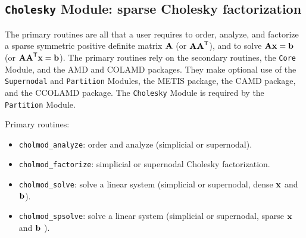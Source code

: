 \documentclass[11pt]{article}
\newcommand{\m}[1]{{\bf{#1}}}       %
\newcommand{\tr}{^{\sf T}}          %
\begin{document}
\newpage \subsection{{\tt Cholesky} Module: sparse Cholesky factorization}

The primary routines are all that a user requires to order, analyze, and
factorize a sparse symmetric positive definite matrix $\m{A}$ (or $\m{AA}\tr$), and
to solve $\m{Ax}=\m{b}$ (or $\m{AA}\tr\m{x}=\m{b}$).  The primary routines rely on the secondary
routines, the {\tt Core} Module, and the AMD and COLAMD packages.  They
make optional use of the {\tt Supernodal} and {\tt Partition} Modules, the
METIS package, the CAMD package, and
the CCOLAMD package.  The {\tt Cholesky} Module is
required by the {\tt Partition} Module.

\vspace{0.1in}
\noindent Primary routines:
    \begin{itemize}
    \item {\tt cholmod\_analyze}: order and analyze (simplicial or supernodal).
    \item {\tt cholmod\_factorize}: simplicial or supernodal Cholesky factorization.
    \item {\tt cholmod\_solve}: solve a linear system (simplicial or supernodal, dense $\m{x}$ and $\m{b}$).
    \item {\tt cholmod\_spsolve}: solve a linear system (simplicial or supernodal, sparse $\m{x}$ and $\m{b}$ ).
    \end{itemize}
\end{document}
